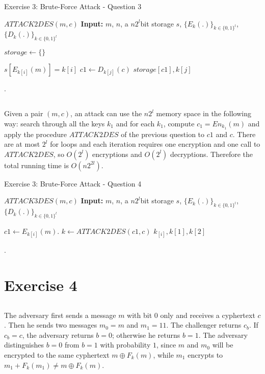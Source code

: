 \documentclass{article}
\begin{document}
\begin{algorithm}[h!]
\caption{Exercise 3: Brute-Force Attack - Question 3}
\begin{algorithmic}[1]
\State $ATTACK2DES(m,c)$
\State \textbf{Input:}  $m$, $n$, a $n2^{l}$bit storage $s$, $\{E_{k}(.)\}_{k\in \{0,1\}^{l}}$, $\{D_{k}(.)\}_{k\in \{0,1\}^{l}}$
 
 \State $storage \gets \{\}$

 \State $s[E_{k[i]}(m)] = k[i]$
 \EndFor
 \State$c1 \gets D_{k[j]}(c)$
 	  $storage[c1], k[j]$
 \EndIf
\EndFor
   
.
\end{algorithmic}
\end{algorithm}

 

\subsection{}
Given a pair $(m, c)$, an attack can use the $n 2^{l}$ memory space in the following way: search through all the keys $k_{1}$ and for each $k_{1}$, compute $c_{1}=En_{k_{1}}(m)$ and apply the procedure $ATTACK2DES$ of the previous question to $c1$ and $c$. There are at most $2^{l}$ for loops and each iteration requires one encryption and one call to $ATTACK2DES$, so $O(2^{l})$ encryptions and $O(2^{l})$ decryptions. 
Therefore the total running time is $O(n2^{2l})$.  


\begin{algorithm}[h!]
\caption{Exercise 3: Brute-Force Attack - Question 4}
\begin{algorithmic}[1]
\State $ATTACK3DES(m, c)$
\State \textbf{Input:}  $m$, $n$, a $n2^{l}$bit storage $s$, $\{E_{k}(.)\}_{k\in \{0,1\}^{l}}$, $\{D_{k}(.)\}_{k\in \{0,1\}^{l}}$
 

 \State $c1\gets E_{k[i]}(m)$.
 \State $k\gets ATTACK2DES(c1, c)$
 	  $k_[i], k[1], k[2]$
 \EndIf
\EndFor
   
.
\end{algorithmic}
\end{algorithm}

\section{Exercise 4}
\subsection{}
The adversary first sends a message $m$ with bit $0$ only and receives a cyphertext $c$. Then he sends two messages $m_{0}=m$ and $m_{1}=11$. The challenger returns $c_{b}$. If $c_{b}=c$, the adversary returns $b=0$; otherwise he returns $b=1$. The adversary distinguishes $b=0$ from $b=1$ with probability $1$, since $m$ and $m_{0}$ will be encrypted to the same cyphertext $m \oplus F_{k}(m)$, while $m_{1}$ encrypts to $m_{1}+F_{k}(m_{1})\neq m \oplus F_{k}(m)$.
\end{document}

